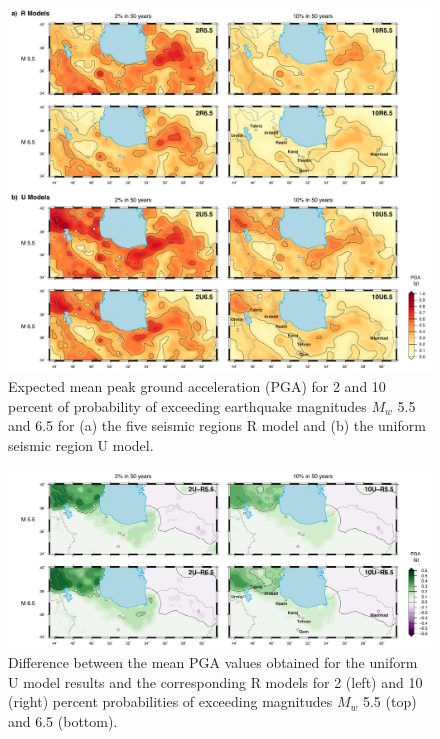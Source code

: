 \begin{figure}[t]
    \centering
    \includegraphics[width=\textwidth]{figures/pdf/figure-08.pdf} 
    \caption{Expected mean peak ground acceleration (PGA) for 2 and 10 percent of probability of exceeding earthquake magnitudes $M_w$ 5.5 and 6.5 for (a) the five seismic regions R model and (b) the uniform seismic region U model.}
    \label{fig:pga}
\end{figure}

\begin{figure}[t]
    \centering
    \includegraphics[width=\textwidth]{figures/pdf/figure-09.pdf} 
    \caption{Difference between the mean PGA values obtained for the uniform U model results and the corresponding R models for 2 (left) and 10 (right) percent probabilities of exceeding magnitudes $M_w$ 5.5 (top) and 6.5 (bottom).}
    \label{fig:pgadiff}
\end{figure}

